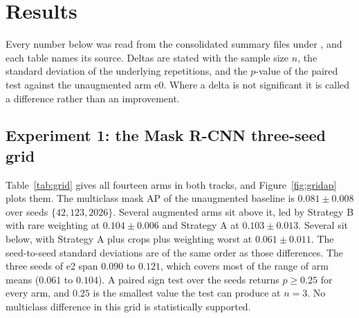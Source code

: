 \section{Results}
\label{sec:results}

Every number below was read from the consolidated summary files under
\protect{}, and each table names its source. Deltas are stated with
the sample size $n$, the standard deviation of the underlying repetitions, and
the $p$-value of the paired test against the unaugmented arm e0. Where a delta
is not significant it is called a difference rather than an improvement.

\subsection*{Experiment 1: the Mask R-CNN three-seed grid}

Table~\ref{tab:grid} gives all fourteen arms in both tracks, and
Figure~\ref{fig:gridap} plots them. The multiclass mask AP of the unaugmented
baseline is $0.081 \pm 0.008$ over seeds $\{42,123,2026\}$. Several augmented
arms sit above it, led by Strategy B with rare weighting at $0.104 \pm 0.006$
and Strategy A at $0.103 \pm 0.013$. Several sit below, with Strategy A plus
crops plus weighting worst at $0.061 \pm 0.011$. The seed-to-seed standard
deviations are of the same order as those differences. The three seeds of e2
span $0.090$ to $0.121$, which covers most of the range of arm means ($0.061$ to $0.104$). A paired
sign test over the seeds returns $p \ge 0.25$ for every arm, and $0.25$ is the
smallest value the test can produce at $n = 3$. No multiclass difference in this
grid is statistically supported.

